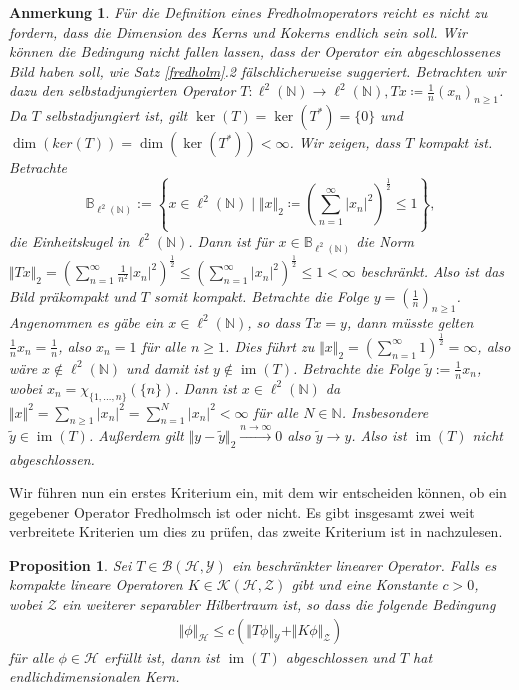 \documentclass[11pt, hidelinks]{article}
\newcommand{\h}{\mathcal{H}}
\newcommand{\im}{\operatorname{im}}
\numberwithin{conj}{section}
\newtheorem{remark}[conj]{Anmerkung}
\newtheorem{proposition}[conj]{Proposition}
\begin{document}
\begin{remark}
Für die Definition eines Fredholmoperators reicht es nicht zu fordern, dass die Dimension des Kerns und Kokerns endlich sein soll. Wir können die Bedingung nicht fallen lassen, dass der Operator ein abgeschlossenes Bild haben soll, wie Satz \ref{fredholm}.2 fälschlicherweise suggeriert. Betrachten wir dazu den selbstadjungierten Operator $T: \ell^2(\mathbb{N}) \to \ell^2(\mathbb{N}), Tx \coloneq \frac{1}{n} (x_n)_{n \geq 1}$. Da $T$ selbstadjungiert ist, gilt $\ker(T) = \ker(T^\ast) = \{0\}$ und $\dim(ker(T)) = \dim(\ker(T^\ast)) < \infty$. Wir zeigen, dass $T$ kompakt ist. Betrachte $$\mathbb{B}_{\ell^2(\mathbb{N})} := \left\{ x \in \ell^2(\mathbb{N}) \; \bigg\vert \; \Vert x \Vert_2 \coloneq \left(\sum_{n=1}^{\infty} \vert x_n \vert^2\right)^{\frac{1}{2}} \leq 1 \right\},$$ die Einheitskugel in $\ell^2(\mathbb{N})$. Dann ist für $x \in \mathbb{B}_{\ell^2(\mathbb{N})}$ die Norm $\Vert Tx \Vert_2 = (\sum_{n=1}^\infty \frac{1}{n^2} \vert x_n \vert^2)^\frac{1}{2} \leq (\sum_{n=1}^\infty \vert x_n \vert^2)^\frac{1}{2} \leq 1 < \infty$ beschränkt. Also ist das Bild präkompakt und $T$ somit kompakt. Betrachte die Folge $y = (\frac{1}{n})_{n \geq 1}$. Angenommen es gäbe ein $x \in \ell^2(\mathbb{N})$, so dass $Tx = y$, dann müsste gelten $\frac{1}{n} x_n = \frac{1}{n}$, also $x_n = 1$ für alle $n \geq 1$. Dies führt zu $\Vert x \Vert_2 = \left( \sum_{n=1}^{\infty} 1 \right)^\frac{1}{2} = \infty$, also wäre $x \notin \ell^2(\mathbb{N})$ und damit ist $y \notin \im(T)$. Betrachte die Folge $\widetilde{y} := \frac{1}{n} x_n$, wobei \( x_n = \chi_{\{1, \ldots, n\}}(\{n\})\). Dann ist $x \in \ell^2(\mathbb{N})$ da \( \Vert x \Vert^2 = \sum_{n \geq 1} \vert x_n \vert^2 = \sum_{n=1}^{N} \vert x_n \vert^2 < \infty\) für alle \( N \in \mathbb{N} \). Insbesondere $\widetilde{y} \in \im(T)$. Außerdem gilt $\Vert y - \widetilde{y} \Vert_2 \xrightarrow[]{n \to \infty} 0$ also $\widetilde{y} \to y$. Also ist $\im(T)$ nicht abgeschlossen.
\end{remark}

Wir führen nun ein erstes Kriterium ein, mit dem wir entscheiden können, ob ein gegebener Operator Fredholmsch ist oder nicht. Es gibt insgesamt zwei weit verbreitete Kriterien um dies zu prüfen, das zweite Kriterium ist in \cite[Theorem 3.4.1]{doll2023spectral} nachzulesen.

\begin{proposition}
    Sei $T \in \mathcal{B}(\h,\mathcal{Y})$ ein beschränkter linearer Operator. Falls es kompakte lineare Operatoren $K \in \mathcal{K}(\h,\mathcal{Z})$ gibt und eine Konstante $c > 0$, wobei $\mathcal{Z}$ ein weiterer separabler Hilbertraum ist, so dass die folgende Bedingung
    \begin{align}
        \Vert\phi\Vert_\h \leq c (\Vert T\phi \Vert_{\mathcal{Y}} + \Vert K\phi \Vert_{\mathcal{Z}})
    \end{align}
    für alle $\phi \in \h$ erfüllt ist, dann ist $\im(T)$ abgeschlossen und $T$ hat endlichdimensionalen Kern.
\end{proposition}
\end{document}
